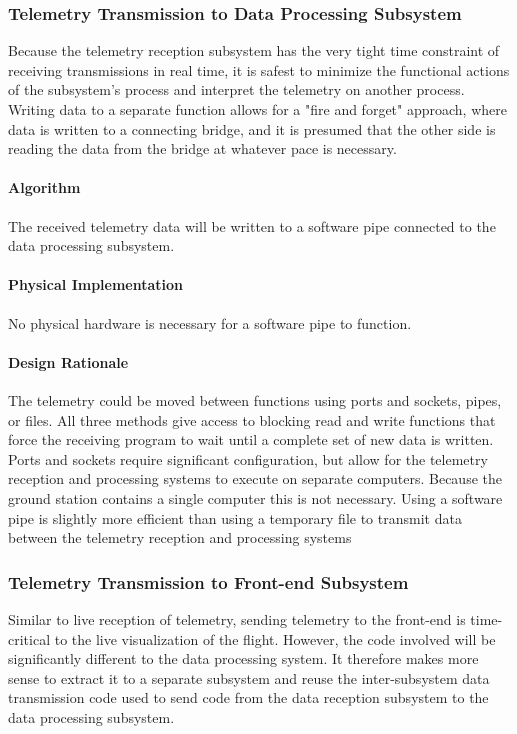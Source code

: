 \documentclass[journal,10pt,onecolumn,compsoc]{IEEEtran}
\begin{document}
		\subsubsection{Telemetry Transmission to Data Processing Subsystem}
			\noindent Because the telemetry reception subsystem has the very tight time constraint of receiving transmissions in real time, it is safest to minimize the functional actions of the subsystem's process and interpret the telemetry on another process.
			Writing data to a separate function allows for a "fire and forget" approach, where data is written to a connecting bridge, and it is presumed that the other side is reading the data from the bridge at whatever pace is necessary.

			\paragraph{Algorithm}
				\noindent The received telemetry data will be written to a software pipe connected to the data processing subsystem.

			\paragraph{Physical Implementation}
				\noindent No physical hardware is necessary for a software pipe to function.

			\paragraph{Design Rationale}
				\noindent The telemetry could be moved between functions using ports and sockets, pipes, or files.
				All three methods give access to blocking read and write functions that force the receiving program to wait until a complete set of new data is written.
				Ports and sockets require significant configuration, but allow for the telemetry reception and processing systems to execute on separate computers.
				Because the ground station contains a single computer this is not necessary.
				Using a software pipe is slightly more efficient than using a temporary file to transmit data between the telemetry reception and processing systems

		\subsubsection{Telemetry Transmission to Front-end Subsystem}
			\noindent Similar to live reception of telemetry, sending telemetry to the front-end is time-critical to the live visualization of the flight.
			However, the code involved will be significantly different to the data processing system.
			It therefore makes more sense to extract it to a separate subsystem and reuse the inter-subsystem data transmission code used to send code from the data reception subsystem to the data processing subsystem.
\end{document}
